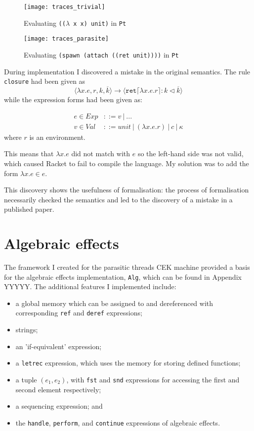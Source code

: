 \documentclass[12pt,a4paper,twoside,openright]{report}
\begin{document}
\begin{figure}
\centering
\caption{Evaluating \texttt{(($\lambda$ x x) unit)} in \texttt{Pt}}
\label{fig:traces_trivial}
\texttt{[image: traces\_trivial]}
\end{figure}

\begin{figure}
\centering
\caption{Evaluating \texttt{(spawn (attach ((ret unit))))} in \texttt{Pt}}
\label{fig:traces_parasite}
\texttt{[image: traces\_parasite]}
\end{figure}

During implementation I discovered a mistake in the original semantics. The rule \texttt{closure} had been given as
$$\langle\lambda x.e, r, k, \overline{k} \rangle \longrightarrow \langle \texttt{ret} \lceil \lambda x.e.r \rceil : k \lhd \overline{k} \rangle$$
while the expression forms had been given as:

\begin{align} 
\nonumber e \in Exp &::= v\:  |\:  ... \\
\nonumber v \in Val &::= unit\:  |\:  (\lambda x.e.r)\:  |\:  c\:  |\:  \kappa \end{align}
where $r$ is an environment.

This means that $\lambda x.e$ did not match with $e$ so the left-hand side was not valid, which caused Racket to fail to compile the language. My solution was to add the form $\lambda x.e \in e$.

This discovery shows the usefulness of formalisation: the process of formalisation necessarily checked the semantics and led to the discovery of a mistake in a published paper.

\section{Algebraic effects}

The framework I created for the parasitic threads CEK machine provided a basis for the algebraic effects implementation, \texttt{Alg}, which can be found in Appendix YYYYY. The additional features I implemented include:

\begin{itemize}
\item a global memory which can be assigned to and dereferenced with corresponding \texttt{ref} and \texttt{deref} expressions;
\item strings;
\item an 'if-equivalent' expression;
\item a \texttt{letrec} expression, which uses the memory for storing defined functions;
\item a tuple $(e_1, e_2)$, with \texttt{fst} and \texttt{snd} expressions for accessing the first and second element respectively;
\item a sequencing expression; and
\item the \texttt{handle}, \texttt{perform}, and \texttt{continue} expressions of algebraic effects.
\end{itemize}
\end{document}
